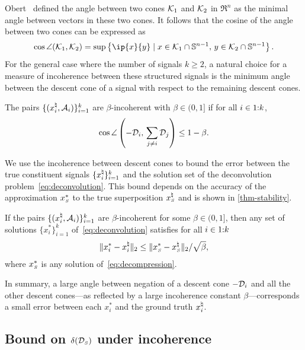 Obert~\cite{obert1991angle} defined the angle between two cones $\mathcal{K}_1$ and $\mathcal{K}_2$ in $\Re^n$ as the minimal angle between vectors in these two cones. It follows that the cosine of the angle between two cones can be expressed as 
\begin{equation*}
\cos\angle(\Kscr_1, \Kscr_2) 
= \sup\left\{\ip{x}{y} \mid x \in \Kscr_1\cap\mS^{n - 1},\, y \in \Kscr_2\cap\mS^{n - 1}\right\}.
\end{equation*}
For the general case where the number of signals $k\ge2$, a natural choice for a measure of incoherence between these structured signals is the minimum angle between the descent cone of a signal with respect to the remaining descent cones. 

\begin{definition} \label{def:incoherence}
    The pairs $\{(x_i^{\natural}, \mathcal{A}_i)\}_{i=1}^k$ are $\beta$-incoherent with $\beta\in(0,1]$ if for all $i\in1\mathord{:}k$,
    \[
        \cos\angle\left({-\mathcal{D}_i},\, \sum_{j \neq i}\mathcal{D}_j\right)
        \leq 1 - \beta. 
    \]
\end{definition}

We use the incoherence between descent cones to bound the error between the true constituent signals $\{x_i^{\natural}\}_{i=1}^k$ and the solution set of the deconvolution problem~\eqref{eq:deconvolution}. This bound depends on the accuracy of the approximation $x_{\scriptscriptstyle S}^*$ to the true superposition $x_{\scriptscriptstyle S}^{\natural}$ and is shown in \autoref{thm-stability}.

\begin{proposition}\label{thm-stability} 
    If the pairs $\{(x_i^{\natural}, \mathcal{A}_i)\}_{i=1}^k$ are $\beta$-incoherent for some $\beta\in(0,1]$, then any set of solutions $\{x_i^*\}_{i=1}^k$ of~\eqref{eq:deconvolution} satisfies for all $i\in1\mathord{:}k$
    \begin{align*}
        \|x_i^* - x_i^{\natural}\|_2 \leq \|x_{\scriptscriptstyle S}^*-x_{\scriptscriptstyle S}^\natural\|_2/\sqrt{\beta},
    \end{align*}
    where $x_{\scriptscriptstyle S}^*$ is any solution of~\eqref{eq:decompression}.
\end{proposition}

In summary, a large angle between negation of a descent cone $-\mathcal{D}_i$ and all the other descent cones---as reflected by a large incoherence constant $\beta$---corresponds a small error between each $x_i^*$ and the ground truth $x_i^{\natural}$.

\subsection{Bound on \texorpdfstring{$\delta(\mathcal{D}_{\scriptscriptstyle S})$}{Ds} under incoherence}\label{sec:3-3-1}

